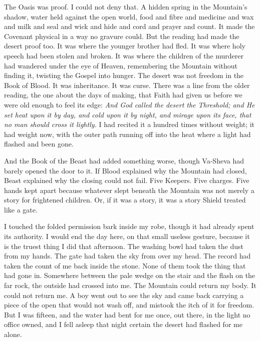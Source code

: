 The Oasis was proof. I could not deny that. A hidden spring in the Mountain's shadow, water held against the open world, food and fibre and medicine and wax and milk and seal and wick and hide and cord and prayer and count. It made the Covenant physical in a way no gravure could. But the reading had made the desert proof too. It was where the younger brother had fled. It was where holy speech had been stolen and broken. It was where the children of the murderer had wandered under the eye of Heaven, remembering the Mountain without finding it, twisting the Gospel into hunger. The desert was not freedom in the Book of Blood. It was inheritance. It was curse. There was a line from the older reading, the one about the days of making, that Faith had given us before we were old enough to feel its edge: \textit{And God called the desert the Threshold; and He set heat upon it by day, and cold upon it by night, and mirage upon its face, that no man should cross it lightly.} I had recited it a hundred times without weight; it had weight now, with the outer path running off into the heat where a light had flashed and been gone.\par

And the Book of the Beast had added something worse, though Va-Sheva had barely opened the door to it. If Blood explained why the Mountain had closed, Beast explained why the closing could not fail. Five Keepers. Five charges. Five hands kept apart because whatever slept beneath the Mountain was not merely a story for frightened children. Or, if it was a story, it was a story Shield treated like a gate.\par

I touched the folded permission bark inside my robe, though it had already spent its authority. I would end the day here, on that small useless gesture, because it is the truest thing I did that afternoon. The washing bowl had taken the dust from my hands. The gate had taken the sky from over my head. The record had taken the count of me back inside the stone. None of them took the thing that had gone in. Somewhere between the pale wedge on the stair and the flash on the far rock, the outside had crossed into me. The Mountain could return my body. It could not return me. A boy went out to see the sky and came back carrying a piece of the open that would not wash off, and mistook the itch of it for freedom. But I was fifteen, and the water had bent for me once, out there, in the light no office owned, and I fell asleep that night certain the desert had flashed for me alone.\par

